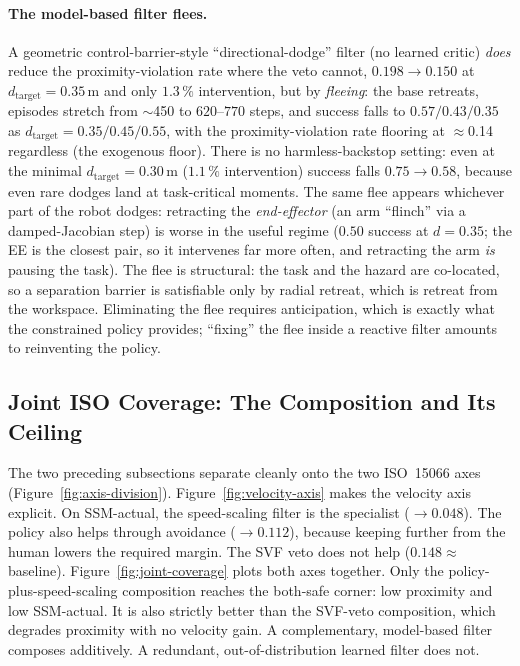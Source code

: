 \documentclass[11pt,a4paper]{report}
\newcommand{\ssm}{SSM}
\newcommand{\iso}{ISO~15066}
\begin{document}
\paragraph{The model-based filter flees.}
A geometric control-barrier-style ``directional-dodge'' filter (no
learned critic) \emph{does} reduce the proximity-violation rate where the veto cannot,
$0.198 \rightarrow 0.150$ at $d_{\mathrm{target}} = 0.35$\,m and only
$1.3\,\%$ intervention, but by \emph{fleeing}: the base retreats,
episodes stretch from $\sim$450 to $620$--$770$ steps, and success
falls to $0.57/0.43/0.35$ as $d_{\mathrm{target}} = 0.35/0.45/0.55$,
with the proximity-violation rate flooring at $\approx$0.14 regardless (the exogenous
floor). There is no harmless-backstop setting: even at the minimal
$d_{\mathrm{target}} = 0.30$\,m ($1.1\,\%$ intervention) success
falls $0.75 \rightarrow 0.58$, because even rare dodges land at
task-critical moments. The same flee appears whichever part of the
robot dodges: retracting the \emph{end-effector} (an arm ``flinch''
via a damped-Jacobian step) is worse in the useful regime ($0.50$
success at $d = 0.35$; the EE is the closest pair, so it intervenes
far more often, and retracting the arm \emph{is} pausing the task).
The flee is structural: the task and the hazard are co-located, so a
separation barrier is satisfiable only by radial retreat, which is
retreat from the workspace. Eliminating the flee requires
anticipation, which is exactly what the constrained policy provides;
``fixing'' the flee inside a reactive filter amounts to reinventing
the policy.

\subsection{Joint ISO Coverage: The Composition and Its Ceiling}
\label{sec:results:joint-coverage}

The two preceding subsections separate cleanly onto the two \iso{} axes
(Figure~\ref{fig:axis-division}). Figure~\ref{fig:velocity-axis} makes
the velocity axis explicit. On \ssm{}-actual, the speed-scaling filter
is the specialist ($\rightarrow 0.048$). The policy also helps through
avoidance ($\rightarrow 0.112$), because keeping further from the human
lowers the required margin. The SVF veto does not help
($0.148 \approx$ baseline). Figure~\ref{fig:joint-coverage} plots both
axes together. Only the policy-plus-speed-scaling composition reaches
the both-safe corner: low proximity and low \ssm{}-actual. It is also
strictly better than the SVF-veto composition, which degrades proximity
with no velocity gain. A complementary, model-based filter composes
additively. A redundant, out-of-distribution learned filter does not.
\end{document}
